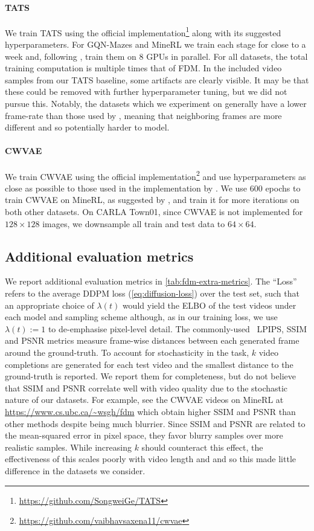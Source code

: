\paragraph{TATS}
We train TATS using the official implementation\footnote{\url{https://github.com/SongweiGe/TATS}} along with its suggested hyperparameters. For GQN-Mazes and MineRL we train each stage for close to a week and, following \citet{ge2022long}, train them on 8 GPUs in parallel. For all datasets, the total training computation is multiple times that of FDM. In the included video samples from our TATS baseline, some artifacts are clearly visible. It may be that these could be removed with further hyperparameter tuning, but we did not pursue this. Notably, the datasets which we experiment on generally have a lower frame-rate than those used by \citet{ge2022long}, meaning that neighboring frames are more different and so potentially harder to model.

\paragraph{CWVAE}
We train CWVAE using the official implementation\footnote{\url{https://github.com/vaibhavsaxena11/cwvae}} and use hyperparameters as close as possible to those used in the implementation by \citet{saxena2021clockwork}. We use 600 epochs to train CWVAE on MineRL, as suggested by \citet{saxena2021clockwork}, and train it for more iterations on both other datasets. On CARLA Town01, since CWVAE is not implemented for $128\times128$ images, we downsample all train and test data to $64\times64$.

\subsection{Additional evaluation metrics}
We report additional evaluation metrics in \cref{tab:fdm-extra-metrics}. The ``Loss'' refers to the average DDPM loss (\cref{eq:diffusion-loss}) over the test set, such that an appropriate choice of $\lambda(t)$ would yield the ELBO of the test videos under each model and sampling scheme although, as in our training loss, we use $\lambda(t):=1$ to de-emphasise pixel-level detail. The commonly-used~\citep{saxena2021clockwork,babaeizadeh2021fitvid} LPIPS, SSIM and PSNR metrics measure frame-wise distances between each generated frame around the ground-truth. To account for stochasticity in the task, $k$ video completions are generated for each test video and the smallest distance to the ground-truth is reported. We report them for completeness, but do not believe that SSIM and PSNR correlate well with video quality due to the stochastic nature of our datasets. For example, see the CWVAE videos on MineRL at \url{https://www.cs.ubc.ca/~wsgh/fdm} which obtain higher SSIM and PSNR than other methods despite being much blurrier. Since SSIM and PSNR are related to the mean-squared error in pixel space, they favor blurry samples over more realistic samples. While increasing $k$ should counteract this effect, the effectiveness of this scales poorly with video length and and so this made little difference in the datasets we consider.


